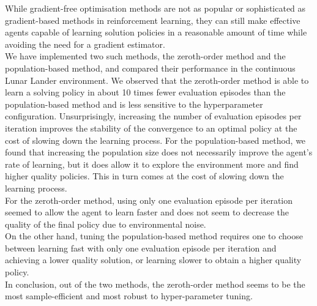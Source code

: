 \documentclass[10pt]{article}
\begin{document}
While gradient-free optimisation methods are not as popular or sophisticated as
gradient-based methods in reinforcement learning, they can still make effective agents
capable of learning solution policies in a reasonable amount of time while avoiding the
need for a gradient estimator.\\
We have implemented two such methods, the zeroth-order method and the population-based
method, and compared their performance in the continuous Lunar Lander environment.
We observed that the zeroth-order method is able to learn a solving policy in about 10
times fewer evaluation episodes than the population-based method and is less sensitive to
the hyperparameter configuration.
Unsurprisingly, increasing the number of evaluation episodes per iteration improves the
stability of the convergence to an optimal policy at the cost of slowing down the
learning process.
For the population-based method, we found that increasing the population size does not
necessarily improve the agent's rate of learning, but it does allow it to explore the
environment more and find higher quality policies.
This in turn comes at the cost of slowing down the learning process.\\
For the zeroth-order method, using only one evaluation episode per iteration seemed to
allow the agent to learn faster and does not seem to decrease the quality of the final
policy due to environmental noise.\\
On the other hand, tuning the population-based method requires one to choose between
learning fast with only one evaluation episode per iteration and achieving a lower
quality solution, or learning slower to obtain a higher quality policy.\\
In conclusion, out of the two methods, the zeroth-order method seems to be the most
sample-efficient and most robust to hyper-parameter tuning.



\end{document}
